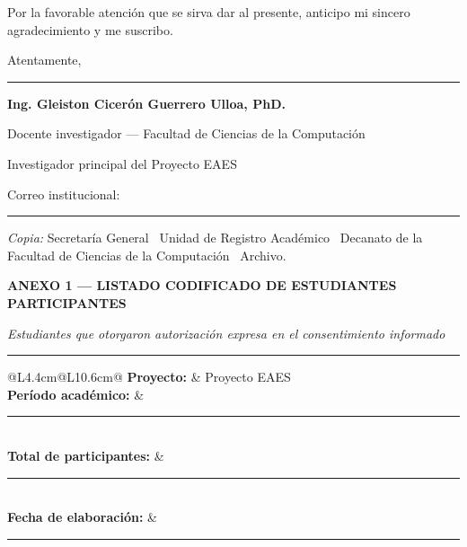 \documentclass[11pt,a4paper]{article}
\newcommand{\campo}[1]{\rule{#1}{0.4pt}}
\begin{document}
Por la favorable atenci\'on que se sirva dar al presente, anticipo mi sincero agradecimiento y me suscribo.

\vspace{14pt}
Atentamente,

\vspace{26pt}
\campo{7.6cm}

\textbf{Ing. Gleiston Cicer\'on Guerrero Ulloa, PhD.}

{\small Docente investigador --- Facultad de Ciencias de la Computaci\'on}

{\small Investigador principal del Proyecto EAES}

{\small Correo institucional: \campo{5.0cm}}

\vspace{8pt}
{\footnotesize \textit{Copia:} Secretar\'ia General \textbullet\ Unidad de Registro Acad\'emico \textbullet\ Decanato de la Facultad de Ciencias de la Computaci\'on \textbullet\ Archivo.}

\clearpage

\begin{center}
	{\sffamily\normalsize\bfseries\color{azulinstitucional} ANEXO 1 --- LISTADO CODIFICADO DE ESTUDIANTES PARTICIPANTES\par}
	\vspace{2pt}
	{\footnotesize\itshape Estudiantes que otorgaron autorizaci\'on expresa en el consentimiento informado\par}
\end{center}

\vspace{6pt}
\hrule
\vspace{8pt}

\begin{tabular}{@{}L{4.4cm}@{}L{10.6cm}@{}}
	\textbf{\small Proyecto:} & Proyecto EAES \\
	\textbf{\small Per\'iodo acad\'emico:} & \campo{10.4cm} \\
	\textbf{\small Total de participantes:} & \campo{10.4cm} \\
	\textbf{\small Fecha de elaboraci\'on:} & \campo{10.4cm} \\
\end{tabular}

\vspace{8pt}
\end{document}
